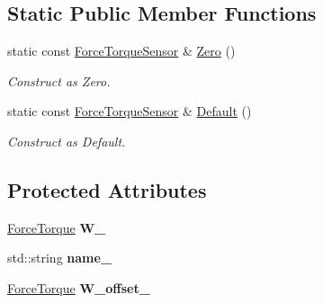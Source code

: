 \subsection*{Static Public Member Functions}
\begin{DoxyCompactItemize}
\item 
static const \hyperlink{classow__core_1_1ForceTorqueSensor}{Force\+Torque\+Sensor} \& \hyperlink{classow__core_1_1ForceTorqueSensor_a0a0e6e0264870fe7c0bb3874579c3bd7}{Zero} ()\hypertarget{classow__core_1_1ForceTorqueSensor_a0a0e6e0264870fe7c0bb3874579c3bd7}{}\label{classow__core_1_1ForceTorqueSensor_a0a0e6e0264870fe7c0bb3874579c3bd7}

\begin{DoxyCompactList}\small\item\em Construct as Zero. \end{DoxyCompactList}\item 
static const \hyperlink{classow__core_1_1ForceTorqueSensor}{Force\+Torque\+Sensor} \& \hyperlink{classow__core_1_1ForceTorqueSensor_a226a9efa8499eb693c2225ea9eb2c48d}{Default} ()\hypertarget{classow__core_1_1ForceTorqueSensor_a226a9efa8499eb693c2225ea9eb2c48d}{}\label{classow__core_1_1ForceTorqueSensor_a226a9efa8499eb693c2225ea9eb2c48d}

\begin{DoxyCompactList}\small\item\em Construct as Default. \end{DoxyCompactList}\end{DoxyCompactItemize}
\subsection*{Protected Attributes}
\begin{DoxyCompactItemize}
\item 
\hyperlink{classow__core_1_1Wrench}{Force\+Torque} {\bfseries W\+\_\+}\hypertarget{classow__core_1_1ForceTorqueSensor_ac963012e6666452028675b77be4f5b16}{}\label{classow__core_1_1ForceTorqueSensor_ac963012e6666452028675b77be4f5b16}

\item 
std\+::string {\bfseries name\+\_\+}\hypertarget{classow__core_1_1ForceTorqueSensor_a6e60e43d3a55e56a9f839a8051e11cde}{}\label{classow__core_1_1ForceTorqueSensor_a6e60e43d3a55e56a9f839a8051e11cde}

\item 
\hyperlink{classow__core_1_1Wrench}{Force\+Torque} {\bfseries W\+\_\+offset\+\_\+}\hypertarget{classow__core_1_1ForceTorqueSensor_ae60129403f4eaa32be81589507503f02}{}\label{classow__core_1_1ForceTorqueSensor_ae60129403f4eaa32be81589507503f02}

\end{DoxyCompactItemize}


